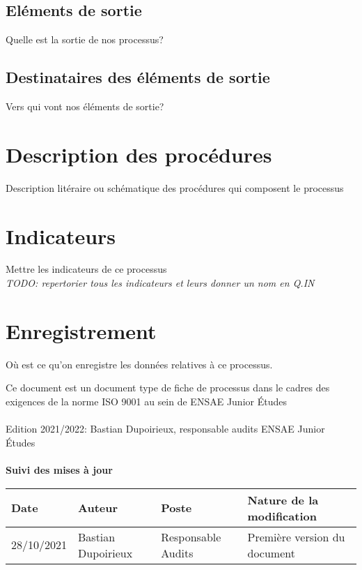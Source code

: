\documentclass[12pt]{article}
\begin{document}
\subsection*{Eléments de sortie}

Quelle est la sortie de nos processus?

\subsection*{Destinataires des éléments de sortie}

Vers qui vont nos éléments de sortie?


\newpage

\section*{Description des procédures}

Description litéraire ou schématique des procédures qui composent le processus

\section*{Indicateurs}

Mettre les indicateurs de ce processus
\\
\textit{TODO: repertorier tous les indicateurs et leurs donner un nom en Q.IN}

\section*{Enregistrement}

Où est ce qu'on enregistre les données relatives à ce processus.

\newpage

\large Ce document est un document type de fiche de processus dans le cadres des exigences de la norme ISO 9001 au sein de ENSAE Junior Études
\\
\\
Edition 2021/2022: Bastian Dupoirieux, responsable audits ENSAE Junior Études
\\
\\
\textbf{\textcolor{rouge_eje}{Suivi des mises à jour}}

\begin{center}
\begin{tabular}{|p{2.5cm} | p{5cm} | p{5cm}|p{5cm}|}
\hline
Date & Auteur & Poste & Nature de la modification \\
\hline
28/10/2021 & Bastian Dupoirieux & Responsable Audits & Première version du document \\
\hline

\end{tabular}
\end{center}
\end{document}
